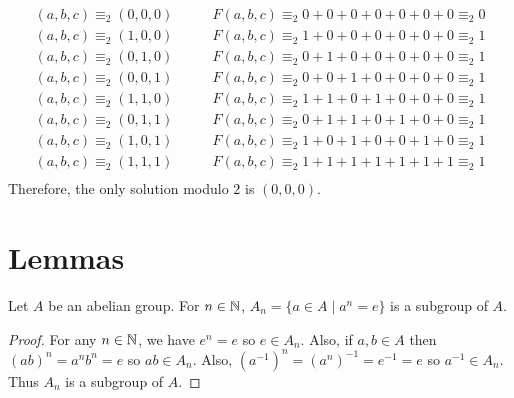 \documentclass[12pt]{extarticle}
\begin{document}
\begin{enumerate}
\begin{enumerate}
\begin{align*}
(a, b, c) \equiv_2 (0, 0, 0) & \quad \quad F(a,b,c) \equiv_2 0 + 0 + 0 + 0 + 0 + 0 + 0 \equiv_2 0 \\
(a, b, c) \equiv_2 (1, 0, 0) & \quad \quad F(a,b,c) \equiv_2 1 + 0 + 0 + 0 + 0 + 0 + 0 \equiv_2 1 \\
(a, b, c) \equiv_2 (0, 1, 0) & \quad \quad F(a,b,c) \equiv_2 0 + 1 + 0 + 0 + 0 + 0 + 0 \equiv_2 1 \\
(a, b, c) \equiv_2 (0, 0, 1) & \quad \quad F(a,b,c) \equiv_2 0 + 0 + 1 + 0 + 0 + 0 + 0 \equiv_2 1 \\
(a, b, c) \equiv_2 (1, 1, 0) & \quad \quad F(a,b,c) \equiv_2 1 + 1 + 0 + 1 + 0 + 0 + 0 \equiv_2 1 \\
(a, b, c) \equiv_2 (0, 1, 1) & \quad \quad F(a,b,c) \equiv_2 0 + 1 + 1 + 0 + 1 + 0 + 0 \equiv_2 1 \\
(a, b, c) \equiv_2 (1, 0, 1) & \quad \quad F(a,b,c) \equiv_2 1 + 0 + 1 + 0 + 0 + 1 + 0 \equiv_2 1 \\
(a, b, c) \equiv_2 (1, 1, 1) & \quad \quad F(a,b,c) \equiv_2 1 + 1 + 1 + 1 + 1 + 1 + 1 \equiv_2 1 \\
\end{align*}
Therefore, the only solution modulo $2$ is $(0,0,0)$. 
\end{enumerate}
\end{enumerate}

\section*{Lemmas}

\begin{lemma} \label{abeliansubgroup}
Let $A$ be an abelian group. For $n \in \mathbb{N}$, $A_n = \{a \in A \mid a^n = e\}$ is a subgroup of $A$.
\end{lemma}
\begin{proof}
For any $n \in \mathbb{N}$, we have $e^n = e$ so $e \in A_n$. Also, if $a, b \in A$ then $(ab)^n = a^n b^n = e$ so $ab \in A_n$. Also, $(a^{-1})^n = (a^n)^{-1} = e^{-1} = e$ so $a^{-1} \in A_n$. Thus $A_n$ is a subgroup of $A$. 
\end{proof}
\end{document}
